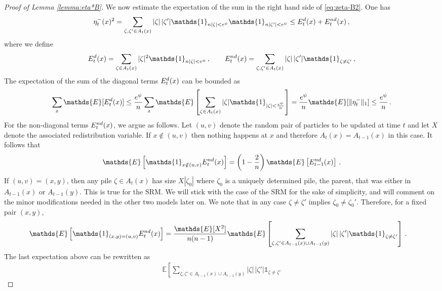 \documentclass[10pt,a4paper]{amsart}
\newcommand{\E}{\mathds{E}}
\newcommand{\car}{\mathds{1}}
\begin{document}
\begin{proof}[Proof of Lemma \ref{lemma:eta*B}]
		We now estimate  the expectation of the sum in the right hand side of \eqref{eq:zeta-B2}. One has 
		\begin{align}\label{eq:Ed-End}
	\eta_t^-(x)^2=\sum_{\zeta,\zeta'\in A_t(x)}|\zeta|\,|\zeta'|\car_{n|\zeta|<{e^\psi}}\car_{n|\zeta'|<{e^\psi}}\le E_t^{\rm d}(x)+E_t^{\rm nd}(x)\,,
			\end{align}
	where we define 
		\begin{align}
	E_t^{\rm d}(x)=\sum_{\zeta\in A_t(x)}|\zeta|^2\car_{n|\zeta|<{e^\psi}}
	\,,\qquad 
	E_t^{\rm nd}(x) = \sum_{\zeta,\zeta'\in A_t(x)}|\zeta|\,|\zeta'|\car_{\zeta\neq \zeta'}\,,
			\end{align}
		The expectation of the sum of the diagonal terms $E_t^{\rm d}(x)$ can be bounded as
		\begin{equation}\label{eq:zeta-B3}
			\sum_{x}\E[E_t^{\rm d}(x)]\le \frac{e^\psi}{n}\sum_{x}\E\left[ \sum_{\zeta\in A_t(x)}|\zeta|\car_{|\zeta|<\frac{e^\psi}{n}}\right]=\frac{e^\psi}{n}\E[\|\eta_t^-\|_1]\le \frac{e^\psi}{n}\,.
		\end{equation}
			For the non-diagonal terms $E_t^{\rm nd}(x)$, we argue as follows.  Let $(u,v)$ denote the random pair of particles to be updated at time $t$ and let $X$ denote the associated redistribution variable. If $x\notin (u,v)$ then nothing happens at $x$ and therefore $A_t(x) = A_{t-1}(x)$ in this case. It follows that
			 \begin{equation}\label{eq:xnot}
			\E\left[\car_{x\notin (u,v)}E_t^{\rm nd}(x)\right] = \left(1-\frac2n\right)\E\left[E^{\rm nd}_{t-1}(x)\right]\,.
					\end{equation}
					If $(u,v) = (x,y)$, then any pile $\zeta\in A_t(x)$ has size $X|\zeta_0|$ where $\zeta_0$ is a uniquely determined pile, the parent, that was either in $A_{t-1}(x)$ or $A_{t-1}(y)$. This is true for the SRM. 	We will stick with the case of the SRM for the sake of simplicity, and will comment on the minor modifications needed in the other two models later on. We note that in any case $\zeta\neq\zeta'$ implies $\zeta_0\neq\zeta_0'$. Therefore, for a fixed pair $(x,y)$,
			 \begin{align}\label{eq:xin}
			\E\left[\car_{(x,y)= (u,v)}E_t^{\rm nd}(x)\right]& =\frac{\E[X^2]}{n(n-1)}\E\left[\sum_{\zeta,\zeta'\in A_{t-1}(x)\cup A_{t-1}(y)}|\zeta|\,|\zeta'|\car_{\zeta\neq \zeta'}
			\right]\,. 
					\end{align}
					The last expectation above can be rewritten as 
					 \begin{align}\label{eq:xin2}
					 \E\left[\sum_{\zeta,\zeta'\in A_{t-1}(x)\cup A_{t-1}(y)}|\zeta|\,|\zeta'|\car_{\zeta\neq \zeta'}

\end{align}
\end{proof}
\end{document}
